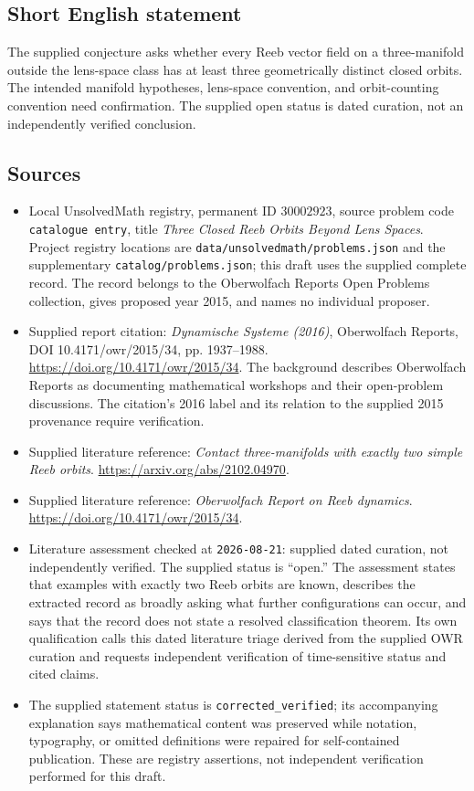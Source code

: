 \documentclass[11pt]{article}
\begin{document}
\subsection{Short English statement}
The supplied conjecture asks whether every Reeb vector field on a three-manifold outside the lens-space class has at least three geometrically distinct closed orbits. The intended manifold hypotheses, lens-space convention, and orbit-counting convention need confirmation. The supplied open status is dated curation, not an independently verified conclusion.
\subsection{Sources}
\begin{itemize}
\item Local UnsolvedMath registry, permanent ID \(30002923\), source problem code \texttt{catalogue entry}, title \emph{Three Closed Reeb Orbits Beyond Lens Spaces}. Project registry locations are \texttt{data/unsolvedmath/problems.json} and the supplementary \texttt{catalog/problems.json}; this draft uses the supplied complete record. The record belongs to the Oberwolfach Reports Open Problems collection, gives proposed year 2015, and names no individual proposer.
\item Supplied report citation: \emph{Dynamische Systeme (2016)}, Oberwolfach Reports, DOI 10.4171/owr/2015/34, pp. 1937--1988. \url{https://doi.org/10.4171/owr/2015/34}. The background describes Oberwolfach Reports as documenting mathematical workshops and their open-problem discussions. The citation's 2016 label and its relation to the supplied 2015 provenance require verification.
\item Supplied literature reference: \emph{Contact three-manifolds with exactly two simple Reeb orbits}. \url{https://arxiv.org/abs/2102.04970}.
\item Supplied literature reference: \emph{Oberwolfach Report on Reeb dynamics}. \url{https://doi.org/10.4171/owr/2015/34}.
\item Literature assessment checked at \texttt{2026-08-21}: supplied dated curation, not independently verified. The supplied status is ``open.'' The assessment states that examples with exactly two Reeb orbits are known, describes the extracted record as broadly asking what further configurations can occur, and says that the record does not state a resolved classification theorem. Its own qualification calls this dated literature triage derived from the supplied OWR curation and requests independent verification of time-sensitive status and cited claims.
\item The supplied statement status is \texttt{corrected\_verified}; its accompanying explanation says mathematical content was preserved while notation, typography, or omitted definitions were repaired for self-contained publication. These are registry assertions, not independent verification performed for this draft.
\end{itemize}
\end{document}
